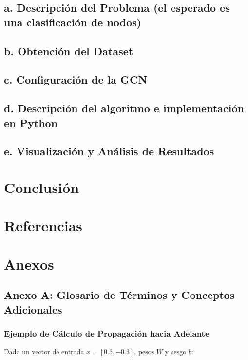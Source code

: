 \documentclass[11pt]{article} %
\begin{document}
\subsection{a. Descripción del Problema (el esperado es una clasificación de nodos)} 



\subsection{b. Obtención del Dataset}



\subsection{c. Configuración de la GCN} 



\subsection*{d. Descripción del algoritmo e implementación en Python}



\subsection*{e. Visualización y Análisis de Resultados}

\newpage
\section{Conclusión}

\newpage
\section{Referencias}
\nocite{*}
\printbibliography
\newpage 
\section{Anexos}
\vspace{10pt}
\subsection{Anexo A: Glosario de Términos y Conceptos Adicionales}
\subsubsection{Ejemplo de Cálculo de Propagación hacia Adelante}
Dado un vector de entrada \(x = [0.5, -0.3]\), pesos \(W\) y sesgo \(b\):
\end{document}
